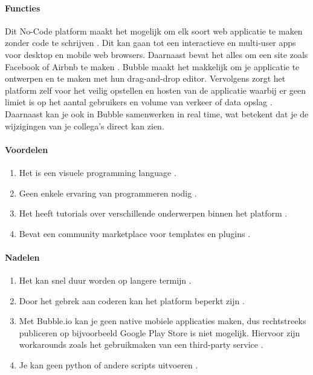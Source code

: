 \paragraph{Functies}
Dit No-Code platform maakt het mogelijk om elk soort web applicatie te maken zonder code te schrijven \autocite{Bubble2024b}.
Dit kan gaan tot een interactieve en multi-user apps voor desktop en mobile web browsers. Daarnaast bevat het alles om een site zoals Facebook of Airbnb te maken \autocite{Bubble2024b}.
Bubble maakt het makkelijk om je applicatie te ontwerpen en te maken met hun drag-and-drop editor.
Vervolgens zorgt het platform zelf voor het veilig opstellen en hosten van de applicatie waarbij er geen limiet is op het aantal gebruikers en volume van verkeer of data opslag \autocite{Bubble2024b}.
Daarnaast kan je ook in Bubble samenwerken in real time, wat betekent dat je de wijzigingen van je collega's direct kan zien.
\paragraph*{Voordelen}
\begin{enumerate}
    \item Het is een visuele programming language \autocite{Minor2022}.
    \item Geen enkele ervaring van programmeren nodig \autocite{Minor2022}.
    \item Het heeft tutorials over verschillende onderwerpen binnen het platform \autocite{Minor2022}.
    \item Bevat een community marketplace voor templates en plugins \autocite{Minor2022}.
\end{enumerate}


\paragraph*{Nadelen}
\begin{enumerate}
    \item Het kan snel duur worden op langere termijn \autocite{Minor2022}.
    \item Door het gebrek aan coderen kan het platform beperkt zijn \autocite{Minor2022}.
    \item Met Bubble.io kan je geen native mobiele applicaties maken, dus rechtstreeks publiceren op bijvoorbeeld Google Play Store is niet mogelijk. Hiervoor zijn workarounds zoals het gebruikmaken van een third-party service \autocite{Sharma2022}.
    \item Je kan geen python of andere scripts uitvoeren \autocite{Sharma2022}.
\end{enumerate}


